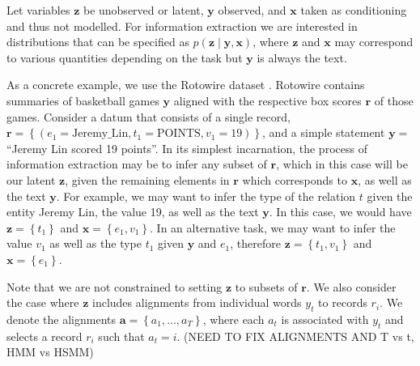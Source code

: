 \documentclass[11pt]{article}
\newcommand\set[1]{\left\{#1\right\}}
\newcommand{\ba}{\mathbf{a}}
\newcommand{\br}{\mathbf{r}}
\newcommand{\bx}{\mathbf{x}}
\newcommand{\by}{\mathbf{y}}
\newcommand{\bz}{\mathbf{z}}
\begin{document}
Let variables $\bz$ be unobserved or latent, $\by$ observed, and $\bx$ taken as conditioning
and thus not modelled.
For information extraction we are interested in distributions that can be specified as $p(\bz\mid\by,\bx)$,
where $\bz$ and $\bx$ may correspond to various quantities depending on the task
but $\by$ is always the text.

As a concrete example, we use the Rotowire dataset \citep{wiseman2017d2t}.
Rotowire contains summaries of basketball games $\by$ aligned with the respective
box scores $\br$ of those games.
Consider a datum that consists of a single record,
$\br = \set{(e_1 = \textrm{Jeremy\_Lin}, t_1 = \textrm{POINTS}, v_1 = 19)}$,
and a simple statement $\by = $``Jeremy Lin scored 19 points''.
In its simplest incarnation, the process of information extraction may be to infer any
subset of $\br$, which in this case will be our latent $\bz$, given the remaining elements in $\br$
which corresponds to $\bx$, as well as the text $\by$.
For example, we may want to infer the type of the relation $t$ given 
the entity Jeremy Lin, the value 19, as well as the text $\by$.
In this case, we would have $\bz = \set{t_1}$ and $\bx = \set{e_1,v_1}$.
In an alternative task, we may want to infer the value $v_1$ 
as well as the type $t_1$ given $\by$ and $e_1$, therefore $\bz = \set{t_1,v_1}$ and $\bx=\set{e_1}$.

Note that we are not constrained to setting $\bz$ to subsets of $\br$.
We also consider the case where $\bz$ includes alignments from individual words $y_t$
to records $r_i$. We denote the alignments $\ba = \set{a_1,\ldots,a_T}$,
where each $a_t$ is associated with $y_t$ and selects a record $r_i$ such that $a_t = i$.
(NEED TO FIX ALIGNMENTS AND T vs t, HMM vs HSMM)
\end{document}

